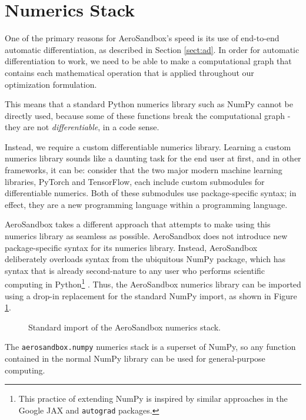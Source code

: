 \section{Numerics Stack}

One of the primary reasons for AeroSandbox's speed is its use of end-to-end automatic differentiation, as described in Section \ref{sect:ad}. In order for automatic differentiation to work, we need to be able to make a computational graph that contains each mathematical operation that is applied throughout our optimization formulation.

This means that a standard Python numerics library such as NumPy cannot be directly used, because some of these functions break the computational graph - they are not \textit{differentiable}, in a code sense.

Instead, we require a custom differentiable numerics library. Learning a custom numerics library sounds like a daunting task for the end user at first, and in other frameworks, it can be: consider that the two major modern machine learning libraries, PyTorch and TensorFlow, each include custom submodules for differentiable numerics. Both of these submodules use package-specific syntax; in effect, they are a new programming language within a programming language.

AeroSandbox takes a different approach that attempts to make using this numerics library as seamless as possible. AeroSandbox does not introduce new package-specific syntax for its numerics library. Instead, AeroSandbox deliberately overloads syntax from the ubiquitous NumPy package, which has syntax that is already second-nature to any user who performs scientific computing in Python\footnote{This practice of extending NumPy is inspired by similar approaches in the Google JAX \cite{jax} and \texttt{autograd} packages.} \cite{numpy}. Thus, the AeroSandbox numerics library can be imported using a drop-in replacement for the standard NumPy import, as shown in Figure \ref{fig:asb-np-import}.

\begin{figure}[H]
    \centering
    
    \caption{Standard import of the AeroSandbox numerics stack.}
    \label{fig:asb-np-import}
\end{figure}

The \texttt{aerosandbox.numpy} numerics stack is a superset of NumPy, so any function contained in the normal NumPy library can be used for general-purpose computing.

